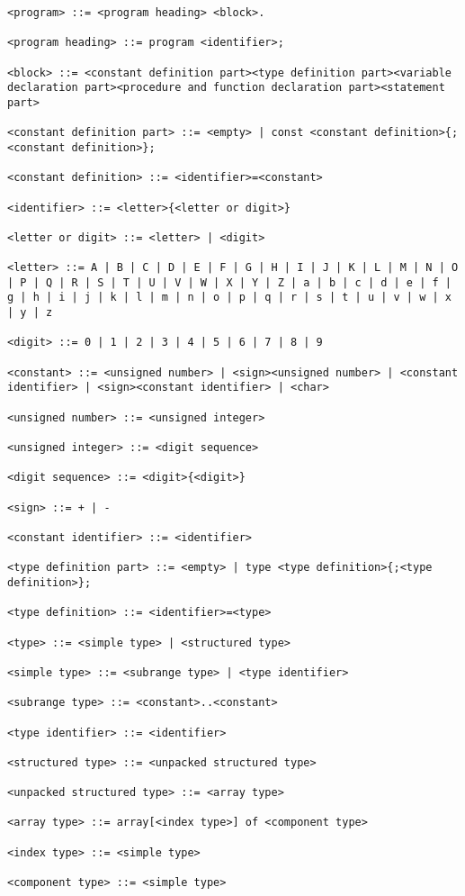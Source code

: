 \documentclass[a4paper,oneside]{report}
\begin{document}
\begin{verbatim}
<program> ::= <program heading> <block>.

<program heading> ::= program <identifier>;

<block> ::= <constant definition part><type definition part><variable declaration part><procedure and function declaration part><statement part>

<constant definition part> ::= <empty> | const <constant definition>{;<constant definition>};

<constant definition> ::= <identifier>=<constant>

<identifier> ::= <letter>{<letter or digit>}

<letter or digit> ::= <letter> | <digit>

<letter> ::= A | B | C | D | E | F | G | H | I | J | K | L | M | N | O | P | Q | R | S | T | U | V | W | X | Y | Z | a | b | c | d | e | f | g | h | i | j | k | l | m | n | o | p | q | r | s | t | u | v | w | x | y | z

<digit> ::= 0 | 1 | 2 | 3 | 4 | 5 | 6 | 7 | 8 | 9

<constant> ::= <unsigned number> | <sign><unsigned number> | <constant identifier> | <sign><constant identifier> | <char>

<unsigned number> ::= <unsigned integer>

<unsigned integer> ::= <digit sequence>

<digit sequence> ::= <digit>{<digit>}

<sign> ::= + | -

<constant identifier> ::= <identifier>

<type definition part> ::= <empty> | type <type definition>{;<type definition>};

<type definition> ::= <identifier>=<type>

<type> ::= <simple type> | <structured type>

<simple type> ::= <subrange type> | <type identifier>

<subrange type> ::= <constant>..<constant>

<type identifier> ::= <identifier>

<structured type> ::= <unpacked structured type>

<unpacked structured type> ::= <array type>

<array type> ::= array[<index type>] of <component type>

<index type> ::= <simple type>

<component type> ::= <simple type>


\end{verbatim}
\end{document}
